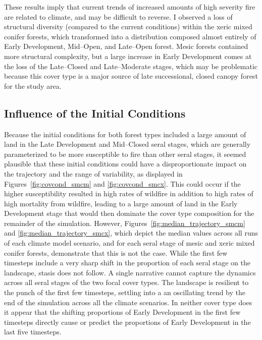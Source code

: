 These results imply that current trends of increased amounts of high severity fire \citep{Miller2012,Mallek2013} are related to climate, and may be difficult to reverse. I observed a loss of structural diversity (compared to the current conditions) within the xeric mixed conifer forests, which transformed into a distribution composed almost entirely of Early Development, Mid--Open, and Late--Open forest. Mesic forests contained more structural complexity, but a large increase in Early Development comes at the loss of the Late--Closed and Late--Moderate stages, which may be problematic because this cover type is a major source of late successional, closed canopy forest for the study area.

\subsection*{Influence of the Initial Conditions}
Because the initial conditions for both forest types included a large amount of land in the Late Development and Mid--Closed seral stages, which are generally parameterized to be more susceptible to fire than other seral stages, it seemed plausible that these initial conditions could have a disproportionate impact on the trajectory and the range of variability, as displayed in Figures~\ref{fig:covcond_smcm} and \ref{fig:covcond_smcx}. This could occur if the higher susceptibility resulted in high rates of wildfire in addition to high rates of high mortality from wildfire, leading to a large amount of land in the Early Development stage that would then dominate the cover type composition for the remainder of the simulation. However, Figures~\ref{fig:median_trajectory_smcm} and \ref{fig:median_trajectory_smcx}, which depict the median values across all runs of each climate model scenario, and for each seral stage of mesic and xeric mixed conifer forests, demonstrate that this is not the case. While the first few timesteps include a very sharp shift in the proportion of each seral stage on the landscape, stasis does not follow. A single narrative cannot capture the dynamics across all seral stages of the two focal cover types. The landscape is resilient to the punch of the first few timesteps, settling into a an oscillating trend by the end of the simulation across all the climate scenarios. In neither cover type does it appear that the shifting proportions of Early Development in the first few timesteps directly cause or predict the proportions of Early Development in the last five timesteps.

